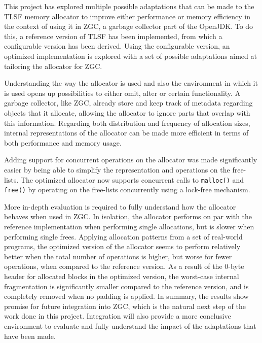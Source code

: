 
This project has explored multiple possible adaptations that can be made to the TLSF memory allocator to improve either performance or memory efficiency in the context of using it in ZGC, a garbage collector part of the OpenJDK. To do this, a reference version of TLSF has been implemented, from which a configurable version has been derived. Using the configurable version, an optimized implementation is explored with a set of possible adaptations aimed at tailoring the allocator for ZGC.

Understanding the way the allocator is used and also the environment in which it is used opens up possibilities to either omit, alter or certain functionality. A garbage collector, like ZGC, already store and keep track of metadata regarding objects that it allocate, allowing the allocator to ignore parts that overlap with this information. Regarding both distribution and frequency of allocation sizes, internal representations of the allocator can be made more efficient in terms of both performance and memory usage.

Adding support for concurrent operations on the allocator was made significantly easier by being able to simplify the representation and operations on the free-lists. The optimized allocator now supports concurrent calls to \texttt{malloc()} and \texttt{free()} by operating on the free-lists concurrently using a lock-free mechanism.

More in-depth evaluation is required to fully understand how the allocator behaves when used in ZGC. In isolation, the allocator performs on par with the reference implementation when performing single allocations, but is slower when performing single frees. Applying allocation patterns from a set of real-world programs, the optimized version of the allocator seems to perform relatively better when the total number of operations is higher, but worse for fewer operations, when compared to the reference version. As a result of the 0-byte header for allocated blocks in the optimized version, the worst-case internal fragmentation is significantly smaller compared to the reference version, and is completely removed when no padding is applied. In summary, the results show promise for future integration into ZGC, which is the natural next step of the work done in this project. Integration will also provide a more conclusive environment to evaluate and fully understand the impact of the adaptations that have been made.

